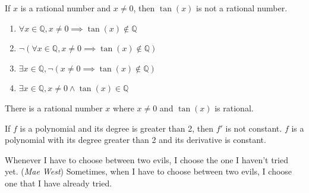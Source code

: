 \documentclass[DIN, pagenumber=false, fontsize=11pt, parskip=half]{scrartcl}
\begin{document}
\begin{problems}
    \problem If $x$ is a rational number and $x \neq 0$, then $\tan(x)$ is not a rational number.
    \answer
    \begin{enumerate}
        \item $\forall x \in \mathbb{Q},x \neq 0 \implies \tan(x) \notin \mathbb{Q}$
        \item $\lnot(\forall x \in \mathbb{Q}, x \neq 0 \implies \tan(x) \notin \mathbb{Q})$
        \item $\exists x \in \mathbb{Q}, \lnot(x \neq 0 \implies \tan(x) \notin \mathbb{Q})$
        \item $\exists{x \in \mathbb{Q}}, x \neq 0 \land \tan(x) \in \mathbb{Q}$
    \end{enumerate}
    There is a rational number $x$ where $x \neq 0$ and $\tan(x)$ is rational.

    \problem If $f$ is a polynomial and its degree is greater than 2, then $f'$ is not constant.
    \answer $f$ is a polynomial with its degree greater than 2 and its derivative is constant.

    \problem Whenever I have to choose between two evils, I choose the one I haven't tried yet. (\textit{Mae West})
    \answer Sometimes, when I have to choose between two evils, I choose one that I have
    already tried.
\end{problems}
\end{document}
